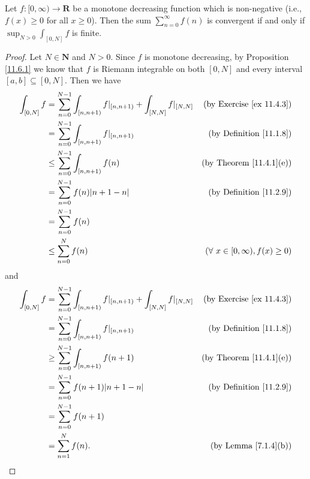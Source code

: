 \begin{proposition}\label{11.6.4}
    Let \(f : [0, \infty) \to \mathbf{R}\) be a monotone decreasing function which is non-negative
    (i.e., \(f(x) \geq 0\) for all \(x \geq 0\)).
    Then the sum \(\sum_{n = 0}^\infty f(n)\) is convergent if and only if \(\sup_{N > 0} \int_{[0, N]} f\) is finite.
\end{proposition}

\begin{proof}
    Let \(N \in \mathbf{N}\) and \(N > 0\).
    Since \(f\) is monotone decreasing, by Proposition \ref{11.6.1} we know that \(f\) is Riemann integrable on both \([0, N]\) and every interval \([a, b] \subseteq [0, N]\).
    Then we have
    \begin{align*}
        \int_{[0, N]} f & = \sum_{n = 0}^{N - 1} \int_{[n, n + 1)} f|_{[n, n + 1)} + \int_{[N, N]} f|_{[N, N]} & \text{(by Exercise \ref{ex 11.4.3})}      \\
                        & = \sum_{n = 0}^{N - 1} \int_{[n, n + 1)} f|_{[n, n + 1)}                             & \text{(by Definition \ref{11.1.8})}       \\
                        & \leq \sum_{n = 0}^{N - 1} \int_{[n, n + 1)} f(n)                                     & \text{(by Theorem \ref{11.4.1}(e))}       \\
                        & = \sum_{n = 0}^{N - 1} f(n) \abs*{n + 1 - n}                                         & \text{(by Definition \ref{11.2.9})}       \\
                        & = \sum_{n = 0}^{N - 1} f(n)                                                                                                      \\
                        & \leq \sum_{n = 0}^N f(n)                                                             & (\forall\ x \in [0, \infty), f(x) \geq 0)
    \end{align*}
    and
    \begin{align*}
        \int_{[0, N]} f & = \sum_{n = 0}^{N - 1} \int_{[n, n + 1)} f|_{[n, n + 1)} + \int_{[N, N]} f|_{[N, N]} & \text{(by Exercise \ref{ex 11.4.3})} \\
                        & = \sum_{n = 0}^{N - 1} \int_{[n, n + 1)} f|_{[n, n + 1)}                             & \text{(by Definition \ref{11.1.8})}  \\
                        & \geq \sum_{n = 0}^{N - 1} \int_{[n, n + 1)} f(n + 1)                                 & \text{(by Theorem \ref{11.4.1}(e))}  \\
                        & = \sum_{n = 0}^{N - 1} f(n + 1) \abs*{n + 1 - n}                                     & \text{(by Definition \ref{11.2.9})}  \\
                        & = \sum_{n = 0}^{N - 1} f(n + 1)                                                                                             \\
                        & = \sum_{n = 1}^N f(n).                                                               & \text{(by Lemma \ref{7.1.4}(b))}
    \end{align*}


\end{proof}
